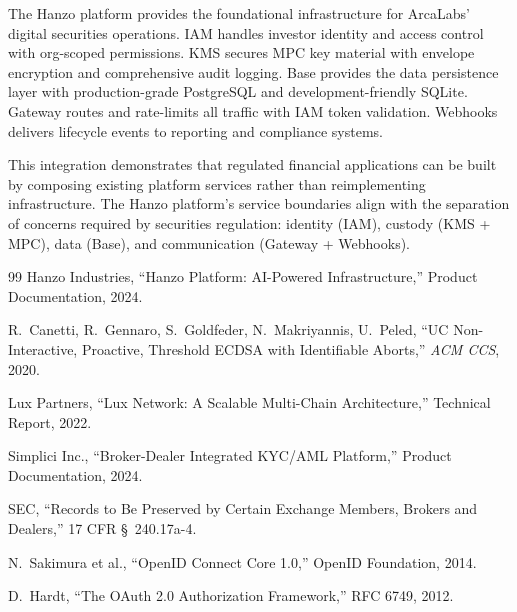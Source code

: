 \documentclass[11pt]{article}
\begin{document}
The Hanzo platform provides the foundational infrastructure for
ArcaLabs' digital securities operations. IAM handles investor identity
and access control with org-scoped permissions. KMS secures MPC key
material with envelope encryption and comprehensive audit logging. Base
provides the data persistence layer with production-grade PostgreSQL and
development-friendly SQLite. Gateway routes and rate-limits all traffic
with IAM token validation. Webhooks delivers lifecycle events to
reporting and compliance systems.

This integration demonstrates that regulated financial applications can
be built by composing existing platform services rather than
reimplementing infrastructure. The Hanzo platform's service boundaries
align with the separation of concerns required by securities
regulation: identity (IAM), custody (KMS + MPC), data (Base), and
communication (Gateway + Webhooks).

\begin{thebibliography}{99}
Hanzo Industries, ``Hanzo Platform: AI-Powered Infrastructure,''
Product Documentation, 2024.

R.~Canetti, R.~Gennaro, S.~Goldfeder, N.~Makriyannis, U.~Peled,
``UC Non-Interactive, Proactive, Threshold ECDSA with Identifiable
Aborts,'' \textit{ACM CCS}, 2020.

Lux Partners, ``Lux Network: A Scalable Multi-Chain Architecture,''
Technical Report, 2022.

Simplici Inc., ``Broker-Dealer Integrated KYC/AML Platform,''
Product Documentation, 2024.

SEC, ``Records to Be Preserved by Certain Exchange Members, Brokers and
Dealers,'' 17 CFR \S~240.17a-4.

N.~Sakimura et al., ``OpenID Connect Core 1.0,'' OpenID Foundation,
2014.

D.~Hardt, ``The OAuth 2.0 Authorization Framework,'' RFC 6749, 2012.
\end{thebibliography}
\end{document}
